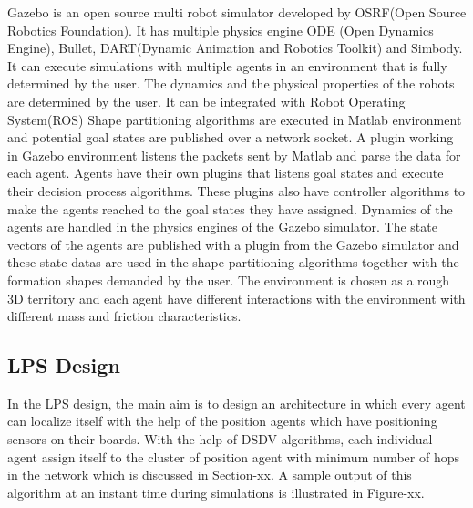     
	Gazebo is an open source multi robot simulator developed by OSRF(Open Source Robotics Foundation). It has multiple physics engine ODE (Open Dynamics Engine), Bullet, DART(Dynamic Animation and Robotics Toolkit) and Simbody. It can execute simulations with multiple agents in an environment that is fully determined by the user. The dynamics and the physical properties of the robots are determined by the user. It can be integrated with Robot Operating System(ROS)
    Shape partitioning algorithms are executed in Matlab environment and  potential goal states are published over a network socket. A plugin working in Gazebo environment listens the packets sent by Matlab and parse the data for each agent. Agents have their own plugins that listens goal states and execute their decision process algorithms. These plugins also have controller algorithms to make the agents reached to the goal states they have assigned. Dynamics of the agents are handled in the physics engines of the Gazebo simulator. The state vectors of the agents are published with a plugin from the Gazebo simulator and these state datas are used in the shape partitioning algorithms together with the formation shapes demanded by the user.   The environment is chosen as a rough 3D territory and each agent have different interactions with the environment with different mass and friction characteristics.
    


	
	\subsection{LPS  Design}
In the LPS design, the main aim is to design an architecture in which every agent can localize itself with the help of the position agents which have positioning sensors on their boards. With the help of DSDV algorithms, each individual agent assign itself to the cluster of position agent with minimum number of hops in the network which is discussed in Section-xx. A sample output of this algorithm at an instant time during simulations is illustrated in Figure-xx. 
	
